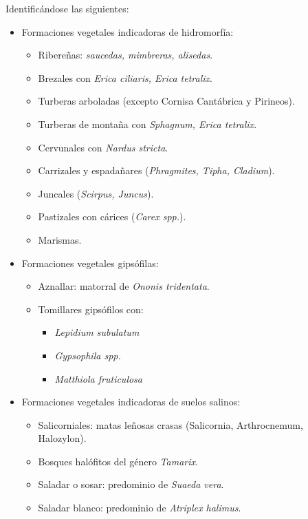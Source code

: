 Identificándose las siguientes:
\begin{itemize}
    \item Formaciones vegetales indicadoras de hidromorfía:
          \begin{itemize}
              \item Ribereñas: \textit{saucedas, mimbreras, alisedas}.
              \item Brezales con \textit{Erica ciliaris, Erica tetralix}.
              \item Turberas arboladas (excepto Cornisa Cantábrica y Pirineos).
              \item Turberas de montaña con \textit{Sphagnum, Erica tetralix}.
              \item Cervunales con \textit{Nardus stricta}.
              \item Carrizales y espadañares (\textit{Phragmites, Tipha, Cladium}).
              \item Juncales (\textit{Scirpus, Juncus}).
              \item Pastizales con cárices (\textit{Carex spp.}).
              \item Marismas.
          \end{itemize}
    \item Formaciones vegetales gipsófilas:
          \begin{itemize}
              \item Aznallar: matorral de \textit{Ononis tridentata}.
              \item Tomillares gipsófilos con:
                    \begin{itemize}
                        \item \textit{Lepidium subulatum}
                        \item \textit{Gypsophila spp.}
                        \item \textit{Matthiola fruticulosa}
                    \end{itemize}
          \end{itemize}
    \item   Formaciones vegetales indicadoras de suelos salinos:
          \begin{itemize}
              \item Salicorniales: matas leñosas crasas (Salicornia, Arthrocnemum, Halozylon).
              \item Bosques halófitos del género \textit{Tamarix}.
              \item Saladar o sosar: predominio de \textit{Suaeda vera}.
              \item Saladar blanco: predominio de \textit{Atriplex halimus}.
          \end{itemize}
\end{itemize}


